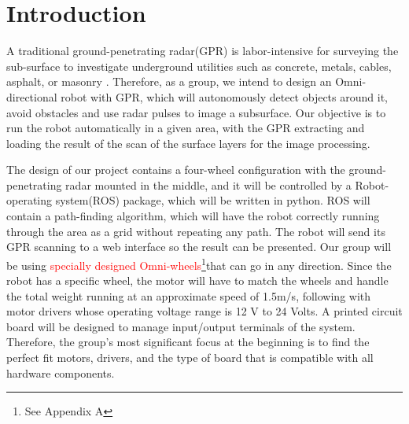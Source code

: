 \section{Introduction}
A traditional ground-penetrating radar(GPR) is labor-intensive for surveying the sub-surface to
investigate underground utilities such as concrete, metals, cables, asphalt, or masonry . Therefore, as a
group, we intend to design an Omni-directional robot with GPR, which will autonomously detect objects
around it, avoid obstacles and use radar pulses to image a subsurface. Our objective is to run the robot
automatically in a given area, with the GPR extracting and loading the result of the scan of the surface
layers for the image processing.

The design of our project contains a four-wheel configuration with the ground-penetrating radar
mounted in the middle, and it will be controlled by a Robot-operating system(ROS) package, which will be
written in python. ROS will contain a path-finding algorithm, which will have the robot correctly
running through the area as a grid without repeating any path. The robot will send its GPR scanning to a
web interface so the result can be presented. Our group will be using \textcolor{red}{specially designed Omni-wheels}\footnote {See Appendix A}that can go in any direction. Since the robot has a specific wheel, the motor will have to match the
wheels and handle the total weight running at an approximate speed of 1.5m/s, following with motor drivers whose
operating voltage range is 12 V to 24 Volts. A printed circuit board will be designed to manage input/output terminals of the system. Therefore, the group's most significant focus at the beginning is to find the perfect fit motors, drivers, and the type of board that is compatible with all hardware components.
